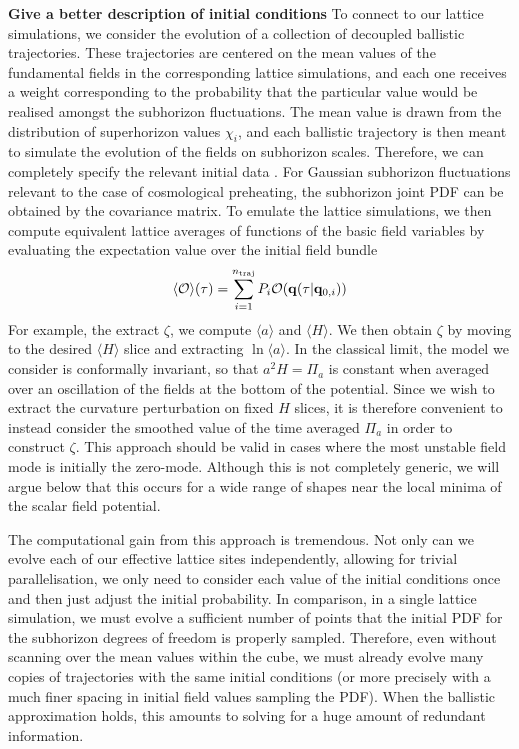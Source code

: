 {\bf Give a better description of initial conditions}
To connect to our lattice simulations, we consider the evolution of a collection of decoupled ballistic trajectories.
These trajectories are centered on the mean values of the fundamental fields in the corresponding lattice simulations, and each one receives a weight corresponding to the probability that the particular value would be realised amongst the subhorizon fluctuations.
The mean value is drawn from the distribution of superhorizon values $\chi_i$, and each ballistic trajectory is then meant to simulate the evolution of the fields on subhorizon scales.
Therefore, we can completely specify the relevant initial data .
For Gaussian subhorizon fluctuations relevant to the case of cosmological preheating, the subhorizon joint PDF can be obtained by the covariance matrix.
To emulate the lattice simulations, we then compute equivalent lattice averages of functions of the basic field variables by evaluating the expectation value over the initial field bundle
\begin{equation}
  \langle \mathcal{O} \rangle(\tau) = \sum_{i=1}^{n_{\rm traj}} P_i\mathcal{O}({\bf q}(\tau|{\bf q}_{0,i}))
\end{equation}
For example, the extract $\zeta$, we compute $\langle a \rangle$ and $\langle H \rangle$.
We then obtain $\zeta$ by moving to the desired $\langle H \rangle$ slice and extracting $\ln\langle a \rangle$.
In the classical limit, the model we consider is conformally invariant, so that $a^2H = \Pi_a$ is constant when averaged over an oscillation of the fields at the bottom of the potential.
Since we wish to extract the curvature perturbation on fixed $H$ slices, it is therefore convenient to instead consider the smoothed value of the time averaged $\Pi_a$ in order to construct $\zeta$.
This approach should be valid in cases where the most unstable field mode is initially the zero-mode.
Although this is not completely generic, we will argue below that this occurs for a wide range of shapes near the local minima of the scalar field potential.

The computational gain from this approach is tremendous.
Not only can we evolve each of our effective lattice sites independently, allowing for trivial parallelisation, we only need to consider each value of the initial conditions once and then just adjust the initial probability.
In comparison, in a single lattice simulation, we must evolve a sufficient number of points that the initial PDF for the subhorizon degrees of freedom is properly sampled.
Therefore, even without scanning over the mean values within the cube, we must already evolve many copies of trajectories with the same initial conditions (or more precisely with a much finer spacing in initial field values sampling the PDF).
When the ballistic approximation holds, this amounts to solving for a huge amount of redundant information.

